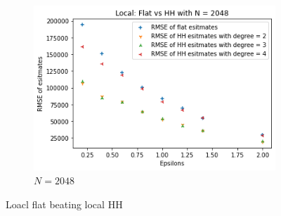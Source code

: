 \documentclass[11pt]{article}
\theoremstyle{definition}
\begin{document}
\begin{figure}[H]
\begin{subfigure}{.3\textwidth}
  \includegraphics[width=\linewidth]{figures/local_flat_hh/flat_beat_hh_N=2048.png}
  \caption{$N=2048$}
  \label{fig:loc_flat_hh3}
\end{subfigure}
\caption{Loacl flat beating local HH}
\label{fig:loc_flat_hh}
\end{figure}
\end{document}
